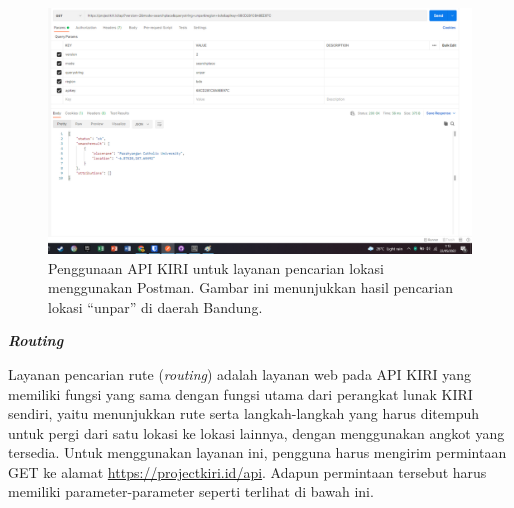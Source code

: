 \documentclass[a4paper,twoside]{article}
\begin{document}
\begin{enumerate}
\begin{figure}[t]
    \centering
    \includegraphics[width=0.74\linewidth]{apikiri-searchplace}
    \caption[Penggunaan API KIRI untuk layanan pencarian lokasi]{Penggunaan API KIRI untuk layanan pencarian lokasi menggunakan Postman. Gambar ini menunjukkan hasil pencarian lokasi ``unpar'' di daerah Bandung.}
    \label{fig:kiri-api-searchplace-usage}
\end{figure}

\vspace{\baselineskip}
\textbf{\textit{\large{Routing}}}
\label{sec:kiri-api-routing}

Layanan pencarian rute (\textit{routing}) adalah layanan web pada API KIRI yang memiliki fungsi yang sama dengan fungsi utama dari perangkat lunak KIRI sendiri, yaitu menunjukkan rute serta langkah-langkah yang harus ditempuh untuk pergi dari satu lokasi ke lokasi lainnya, dengan menggunakan angkot yang tersedia. Untuk menggunakan layanan ini, pengguna harus mengirim permintaan GET ke alamat \href{https://projectkiri.id/api}{https://projectkiri.id/api}. Adapun permintaan tersebut harus memiliki parameter-parameter seperti terlihat di bawah ini.


\end{enumerate}
\end{document}
